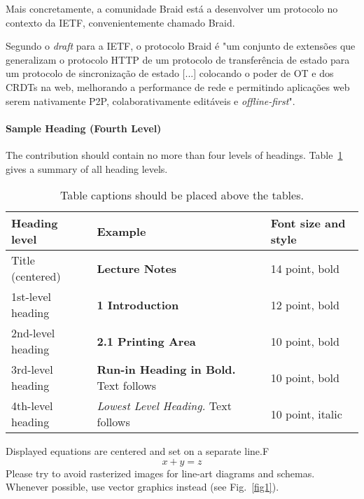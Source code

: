\documentclass[runningheads]{llncs}
\begin{document}
            Mais concretamente, a comunidade Braid está a desenvolver um protocolo no contexto da IETF, 
            convenientemente chamado Braid. 

            Segundo o {\itshape draft} para a IETF, o protocolo Braid é "um conjunto de extensões 
            que generalizam o protocolo HTTP de um protocolo de transferência de estado para um 
            protocolo de sincronização de estado [...] colocando o poder de OT e dos CRDTs na web, 
            melhorando a performance de rede e permitindo aplicações web serem nativamente P2P, 
            colaborativamente editáveis e {\itshape offline-first}"\cite{braid-spec}. 


        \paragraph{Sample Heading (Fourth Level)}
        The contribution should contain no more than four levels of
        headings. Table~\ref{tab1} gives a summary of all heading levels.

        \begin{table}
        \caption{Table captions should be placed above the
        tables.}\label{tab1}
        \begin{tabular}{|l|l|l|}
        \hline
        Heading level &  Example & Font size and style\\
        \hline
        Title (centered) &  {\Large\bfseries Lecture Notes} & 14 point, bold\\
        1st-level heading &  {\large\bfseries 1 Introduction} & 12 point, bold\\
        2nd-level heading & {\bfseries 2.1 Printing Area} & 10 point, bold\\
        3rd-level heading & {\bfseries Run-in Heading in Bold.} Text follows & 10 point, bold\\
        4th-level heading & {\itshape Lowest Level Heading.} Text follows & 10 point, italic\\
        \hline
        \end{tabular}
        \end{table}


        \noindent Displayed equations are centered and set on a separate
        line.F
        \begin{equation}
        x + y = z
        \end{equation}
        Please try to avoid rasterized images for line-art diagrams and
        schemas. Whenever possible, use vector graphics instead (see
        Fig.~\ref{fig1}).
\end{document}
